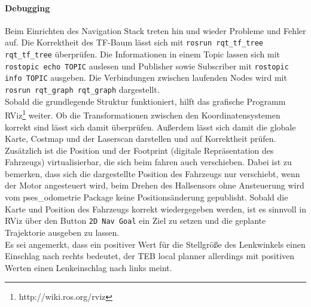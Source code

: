 \paragraph{Debugging}
Beim Einrichten des Navigation Stack treten hin und wieder Probleme und Fehler auf. Die Korrektheit des TF-Baum l\"asst sich mit \texttt{rosrun rqt\_tf\_tree rqt\_tf\_tree} \"uberpr\"ufen. Die Informationen in einem Topic lassen sich mit \texttt{rostopic echo TOPIC} auslesen und Publisher sowie Subscriber mit \texttt{rostopic info TOPIC} ausgeben. Die Verbindungen zwischen laufenden Nodes wird mit \texttt{rosrun rqt\_graph rqt\_graph} dargestellt.\\
Sobald die grundlegende Struktur funktioniert, hilft das grafische Programm RViz\footnote{http://wiki.ros.org/rviz} weiter. Ob die Transformationen zwischen den Koordinatensystemen korrekt sind l\"asst sich damit \"uberpr\"ufen. Au\ss{}erdem l\"asst sich damit die globale Karte, Costmap und der Laserscan darstellen und auf Korrektheit pr\"ufen. Zus\"atzlich ist die Position und der Footprint (digitale Repr\"asentation des Fahrzeugs) virtualisierbar, die sich beim fahren auch verschieben. Dabei ist zu bemerken, dass sich die dargestellte Position des Fahrzeugs nur verschiebt, wenn der Motor angesteuert wird, beim Drehen des Hallsensors ohne Ansteuerung wird vom pses\_odometrie Package keine Positions\"anderung gepublisht. Sobald die Karte und Position des Fahrzeugs korrekt wiedergegeben werden, ist es sinnvoll in RViz \"uber den Button \texttt{2D Nav Goal} ein Ziel zu setzen und die geplante Trajektorie ausgeben zu lassen.\\
Es sei angemerkt, dass ein positiver Wert f\"ur die Stellgr\"o\ss{}e des Lenkwinkels einen Einschlag nach rechts bedeutet, der TEB local planner allerdings mit positiven Werten einen Lenkeinschlag nach links meint.


